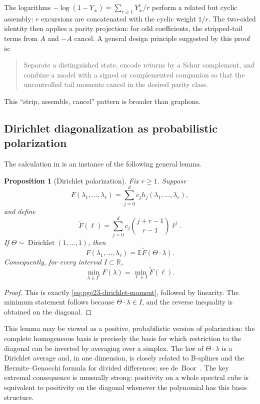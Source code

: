 ﻿\documentclass[11pt]{article}
\newtheorem{proposition}[theorem]{Proposition}
\numberwithin{equation}{section}
\newcommand{\R}{\mathbb R}
\newcommand{\E}{\mathbb E}
\begin{document}
The logarithms $-\log(1-Y_\pm)=\sum_{r\ge1}Y_\pm^r/r$ perform a related but cyclic assembly: $r$ excursions are concatenated with the cyclic weight $1/r$.
The two-sided identity then applies a parity projection: for odd coefficients, the stripped-tail terms from $A$ and $-A$ cancel.
A general design principle suggested by this proof is:
\begin{quote}
  Separate a distinguished state, encode returns by a Schur complement, and combine a model with a signed or complemented companion so that the uncontrolled tail moments cancel in the desired parity class.
\end{quote}
This ``strip, assemble, cancel'' pattern is broader than graphons.

\subsection{Dirichlet diagonalization as probabilistic polarization}

The calculation in  is an instance of the following general lemma.

\begin{proposition}[Dirichlet polarization]\label{prop:general-dirichlet}
  Fix $r\ge1$.
  Suppose
  \[
    F(\lambda_1,\ldots,\lambda_r)
    =\sum_{j=0}^d c_jh_j(\lambda_1,\ldots,\lambda_r),
  \]
  and define
  \[
    \widetilde F(\ell)
    =\sum_{j=0}^d c_j\binom{j+r-1}{r-1}\ell^j.
  \]
  If $\Theta\sim\operatorname{Dirichlet}(1,\ldots,1)$, then
  \[
    F(\lambda_1,\ldots,\lambda_r)
    =\E\widetilde F(\Theta\cdot\lambda).
  \]
  Consequently, for every interval $I\subset\R$,
  \[
    \min_{\lambda\in I^r}F(\lambda)
    =\min_{\ell\in I}\widetilde F(\ell).
  \]
\end{proposition}

\begin{proof}
  This is exactly \eqref{eq:pge23-dirichlet-moment}, followed by linearity.
  The minimum statement follows because $\Theta\cdot\lambda\in I$, and the reverse inequality is obtained on the diagonal.
\end{proof}

This lemma may be viewed as a positive, probabilistic version of polarization: the complete homogeneous basis is precisely the basis for which restriction to the diagonal can be inverted by averaging over a simplex.
The law of $\Theta\cdot\lambda$ is a Dirichlet average and, in one dimension, is closely related to B-splines and the Hermite--Genocchi formula for divided differences; see de~Boor~\cite{deBoor2005}.
The key extremal consequence is unusually strong: positivity on a whole spectral cube is equivalent to positivity on the diagonal whenever the polynomial has this basis structure.
\end{document}

